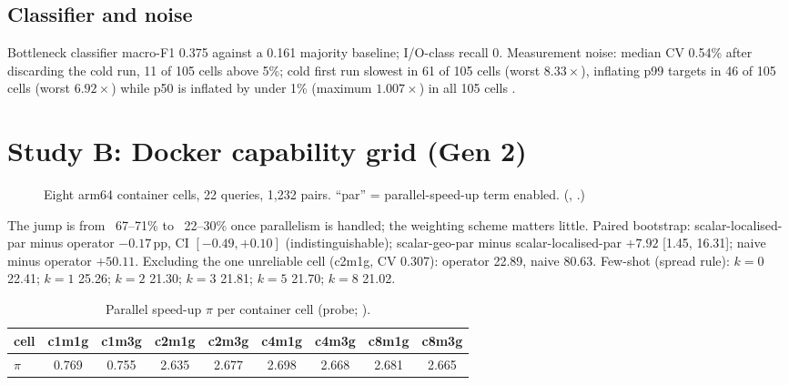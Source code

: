 \subsection{Classifier and noise}
Bottleneck classifier macro-F1 0.375 against a 0.161 majority baseline; I/O-class recall 0. Measurement noise: median CV 0.54\% after discarding the cold run, 11 of 105 cells above 5\%; cold first run slowest in 61 of 105 cells (worst $8.33\times$), inflating p99 targets in 46 of 105 cells (worst $6.92\times$) while p50 is inflated by under 1\% (maximum $1.007\times$) in all 105 cells \evFILE.

\section{Study B: Docker capability grid (Gen 2)}
\begin{figure}[ht]
\centering
{}
\caption{Eight arm64 container cells, 22 queries, 1{,}232 pairs. ``par'' = parallel-speed-up term enabled. (, \evFILE.)}
\label{fig:grid}
\end{figure}
The jump is from ~67--71\% to ~22--30\% once parallelism is handled; the weighting scheme matters little. Paired bootstrap: scalar-localised-par minus operator $-0.17$\,pp, CI $[-0.49,+0.10]$ (indistinguishable); scalar-geo-par minus scalar-localised-par $+7.92$ [1.45, 16.31]; naive minus operator $+50.11$.
Excluding the one unreliable cell (c2m1g, CV 0.307): operator 22.89, naive 80.63. Few-shot (spread rule): $k{=}0$ 22.41; $k{=}1$ 25.26; $k{=}2$ 21.30; $k{=}3$ 21.81; $k{=}5$ 21.70; $k{=}8$ 21.02.
\begin{table}[ht]\centering\small
\caption{Parallel speed-up $\pi$ per container cell (probe; ).}\label{tab:speedup}
\begin{tabular}{@{}lcccccccc@{}}
\toprule cell & c1m1g & c1m3g & c2m1g & c2m3g & c4m1g & c4m3g & c8m1g & c8m3g\\ \midrule
$\pi$ & 0.769 & 0.755 & 2.635 & 2.677 & 2.698 & 2.668 & 2.681 & 2.665\\
\bottomrule
\end{tabular}
\end{table}
